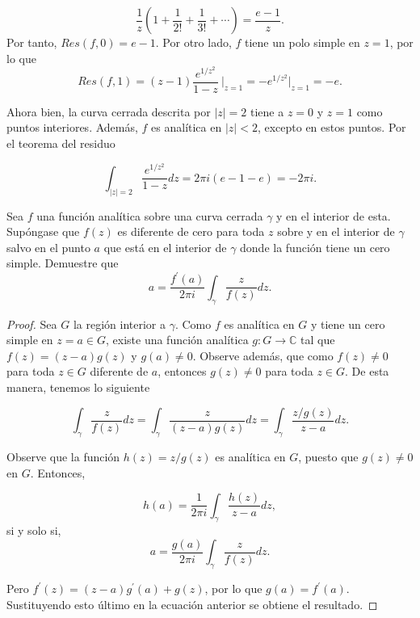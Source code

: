 \documentclass[12pt]{article}
\newcommand{\C}{\mathbb{C}}
\newenvironment{problem}[2][Problema]{\begin{trivlist}
\item[\hskip \labelsep {\bfseries #1}\hskip \labelsep {\bfseries #2.}]}{\end{trivlist}}
\begin{document}
$$\frac{1}{z}(1 + \frac{1}{2!} + \frac{1}{3!} + \cdots ) = \frac{e-1}{z} .$$
Por tanto, $Res(f, 0) = e-1.$ Por otro lado, $f$ tiene un polo simple en $z=1$, por lo que 
$$Res(f, 1) = (z-1)\frac{e^{1/z^2}}{1-z} \ \biggr\rvert_{z=1} = -e^{1/z^2}\biggr\rvert_{z=1} = -e. $$

Ahora bien, la curva cerrada descrita por $\lvert z \rvert = 2$ tiene a $z=0$ y $z=1$ como puntos interiores. Además, $f$ es analítica en $\lvert z \rvert < 2$, excepto en estos puntos. Por el teorema del residuo

$$\int_{\lvert z \rvert = 2} \frac{e^{1/z^2}}{1-z} dz = 2\pi i (e-1 - e) =-2\pi i.$$



\begin{problem}{1, agosto 2014}
Sea $f$ una función analítica sobre una curva cerrada $\gamma$ y en el interior de esta. Supóngase que $f(z)$ es diferente de cero para toda $z$ sobre y en el interior de $\gamma$ salvo en el punto $a$ que está en el interior de $\gamma$ donde la función tiene un cero simple. 
Demuestre que
$$a= \frac{f^\prime(a)}{2 \pi i} \int_\gamma \frac{z}{f(z)} dz. $$
\end{problem}
\begin{proof}
Sea $G$ la región interior a $\gamma$. Como $f$ es analítica en $G$ y tiene un cero simple en $z=a\in G$, existe una función analítica $g: G \rightarrow \C$ tal que $f(z) = (z-a)g(z)$ y $g(a) \neq 0.$ Observe además, que como $f(z) \neq 0$ para toda $z \in G$ diferente de $a$, entonces $g(z) \neq 0$ para toda $z\in G.$ De esta manera, tenemos lo siguiente

$$ \int_{\gamma} \frac{z}{f(z)} dz = \int_{\gamma} \frac{z}{(z-a) g(z)} dz = \int_{\gamma} \frac{z/g(z)}{z-a} dz. $$

Observe que la función $h(z) = z / g(z)$ es analítica en $G$, puesto que $g(z) \neq 0$ en $G$. Entonces, 

$$ h(a) = \frac{1}{2\pi i} \int_{\gamma} \frac{h(z)}{z-a} dz, $$
si y solo si,
$$ a  = \frac{g(a)}{2 \pi i}\int_\gamma \frac{z}{f(z)} dz. $$

Pero $f^\prime(z) = (z-a)g^\prime(a) + g(z)$, por lo que $g(a) = f^\prime(a).$ Sustituyendo esto último en la ecuación anterior se obtiene el resultado.
\end{proof}
\end{document}
